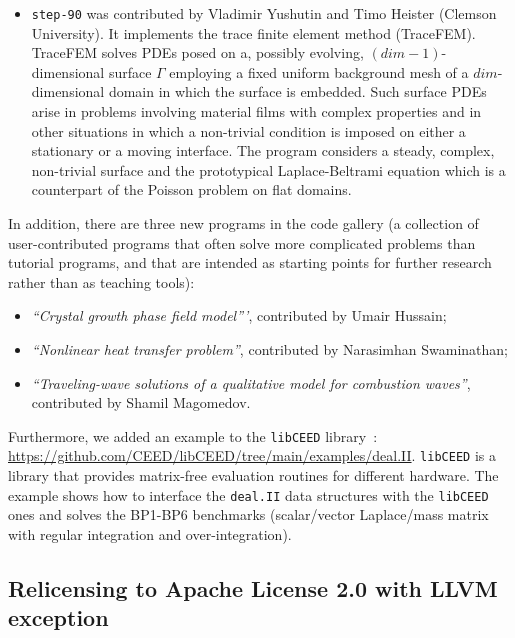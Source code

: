 \documentclass{ansarticle-preprint}
\newcommand{\specialword}[1]{\texttt{#1}}
\newcommand{\dealii}{{\specialword{deal.II}}\xspace}
\begin{document}
\begin{itemize}
    within matrix-free loops in \dealii.
  \item
    \texttt{step-90} was contributed by Vladimir Yushutin and Timo Heister (Clemson University).
    It implements the trace finite element method (TraceFEM). TraceFEM solves PDEs
    posed on a, possibly evolving, $(dim-1)$-dimensional surface $\Gamma$ employing
    a fixed uniform background mesh of a $dim$-dimensional domain in which
    the surface is embedded. Such surface PDEs arise in problems involving
    material films with complex properties and in other situations in which
    a non-trivial condition is imposed on either a stationary or a moving interface.
    The program considers a steady, complex, non-trivial surface and the prototypical
    Laplace-Beltrami equation which is a counterpart of
    the Poisson problem on flat domains.
\end{itemize}

In addition, there are three new programs in the code gallery (a collection of
user-contributed programs that often solve more complicated problems
than tutorial programs, and that are intended as starting points for further
research rather than as teaching tools):
\begin{itemize}
  \item \textit{``Crystal growth phase field model'''},
    contributed by Umair Hussain;
  \item \textit{``Nonlinear heat transfer problem''}, contributed by
    Narasimhan Swaminathan;
  \item \textit{``Traveling-wave solutions of a qualitative model for combustion waves''}, contributed by
    Shamil Magomedov.
\end{itemize}

Furthermore, we added an example to the \texttt{libCEED}
library~\cite{brown2021libceed}:
\url{https://github.com/CEED/libCEED/tree/main/examples/deal.II}.
\texttt{libCEED} is a library that provides matrix-free evaluation routines
for different hardware. The example shows how to interface the \dealii{}
data structures with the \texttt{libCEED} ones and solves the BP1-BP6
benchmarks (scalar/vector Laplace/mass matrix with regular integration and
over-integration).


\subsection{Relicensing to Apache License 2.0 with LLVM exception}
\label{sec:license}
\end{document}

